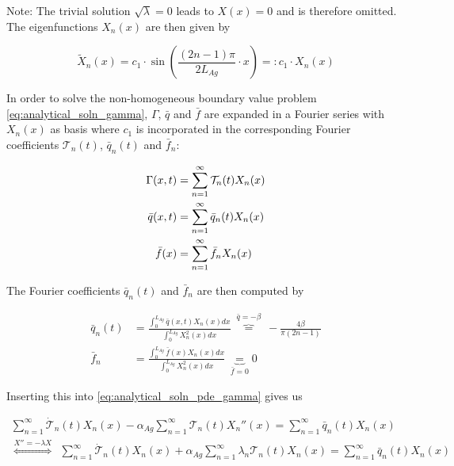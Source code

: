 \documentclass{scrartcl}[12pt, halfparskip]
\numberwithin{equation}{section}
\numberwithin{figure}{section}
\numberwithin{table}{section}
\begin{document}
Note: The trivial solution $\sqrt{\lambda}=0$ leads to $X(x) = 0$ and is therefore omitted. \\
The eigenfunctions $X_n(x)$ are then given by

\begin{equation}
	\tilde{X}_n(x) = c_1 \cdot \sin\left(\frac{(2n -1)\pi}{2 L_{Ag}} \cdot x\right) =: c_1 \cdot X_n(x)
\end{equation}

In order to solve the non-homogeneous boundary value problem \cref{eq:analytical_soln_gamma}, $\Gamma$, $\bar{q}$ and $\bar{f}$ are expanded in a Fourier series with $X_n(x)$ as basis where $c_1$ is incorporated in the corresponding Fourier coefficients $\mathcal{T}_n(t)$, $\bar{q}_n(t)$ and $\bar{f}_n$:

\begin{subequations}
	\centering
	\begin{align}
		\Gamma(x,t) & = \sum_{n=1}^{\infty} \mathcal{T}_n(t) X_n(x) \\
		\bar{q}(x,t) & = \sum_{n=1}^{\infty} \bar{q}_n(t) X_n(x) \\
		\bar{f}(x) & = \sum_{n=1}^{\infty} \bar{f}_n X_n(x)
	\end{align}
\end{subequations}

The Fourier coefficients $\bar{q}_n(t)$ and $\bar{f}_n$ are then computed by

\begin{subequations}
	\begin{align}
		\bar{q}_n(t) & = \frac{\int_{0}^{L_{Ag}} \bar{q}(x,t) X_n(x) dx}{\int_{0}^{L_{Ag}} X_n^2(x) dx} \ \overbrace{=}^{\bar{q}=-\beta} \ - \frac{4 \beta}{\pi (2n - 1)} \\
		\bar{f}_n & = \frac{\int_{0}^{L_{Ag}} \bar{f}(x) X_n(x) dx}{\int_{0}^{L_{Ag}} X_n^2(x) dx} \ \underbrace{=}_{\bar{f}=0} 0
	\end{align}
\end{subequations}

Inserting this into \cref{eq:analytical_soln_pde_gamma} gives us

\begin{align*}
	\sum_{n=1}^{\infty} \dot{\mathcal{T}}_n(t) X_n(x) - \alpha_{Ag} \sum_{n=1}^{\infty} \mathcal{T}_n(t) X_n''(x) = \sum_{n=1}^{\infty} \bar{q}_n(t) X_n(x) \nonumber \\
	\stackrel{X'' = - \lambda X}{\Leftrightarrow} \ \ \sum_{n=1}^{\infty} \dot{\mathcal{T}}_n(t) X_n(x) + \alpha_{Ag} \sum_{n=1}^{\infty} \lambda_n \mathcal{T}_n(t) X_n(x) = \sum_{n=1}^{\infty} \bar{q}_n(t) X_n(x)
\end{align*}
\end{document}
